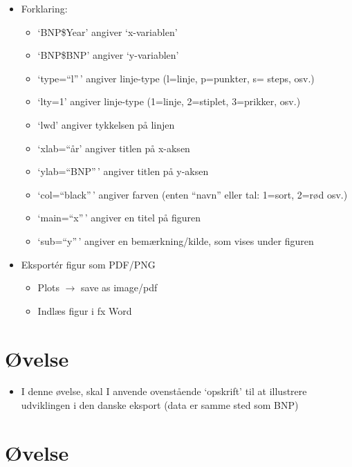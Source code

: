 \documentclass[
  12pt,
]{article}
\providecommand{\tightlist}{%
  \setlength{\itemsep}{0pt}\setlength{\parskip}{0pt}}
\begin{document}
\begin{itemize}
\tightlist
\item
  Forklaring:

  \begin{itemize}
  \tightlist
  \item
    `BNP\$Year' angiver `x-variablen'
  \item
    `BNP\$BNP' angiver `y-variablen'
  \item
    `type=``l''\,' angiver linje-type (l=linje, p=punkter, s= steps,
    osv.)
  \item
    `lty=1' angiver linje-type (1=linje, 2=stiplet, 3=prikker, osv.)
  \item
    `lwd' angiver tykkelsen på linjen
  \item
    `xlab=``år' angiver titlen på x-aksen
  \item
    `ylab=``BNP''\,' angiver titlen på y-aksen
  \item
    `col=``black''\,' angiver farven (enten ``navn'' eller tal: 1=sort,
    2=rød osv.)
  \item
    `main=``x''\,' angiver en titel på figuren
  \item
    `sub=``y''\,' angiver en bemærkning/kilde, som vises under figuren
  \end{itemize}
\item
  Eksportér figur som PDF/PNG

  \begin{itemize}
  \tightlist
  \item
    Plots \(\rightarrow\) save as image/pdf
  \item
    Indlæs figur i fx Word
  \end{itemize}
\end{itemize}

\hypertarget{uxf8velse}{%
\section{Øvelse}\label{uxf8velse}}

\begin{itemize}
\tightlist
\item
  I denne øvelse, skal I anvende ovenstående `opskrift' til at
  illustrere udviklingen i den danske eksport (data er samme sted som
  BNP)
\end{itemize}

\hypertarget{uxf8velse-1}{%
\section{Øvelse}\label{uxf8velse-1}}
\end{document}
